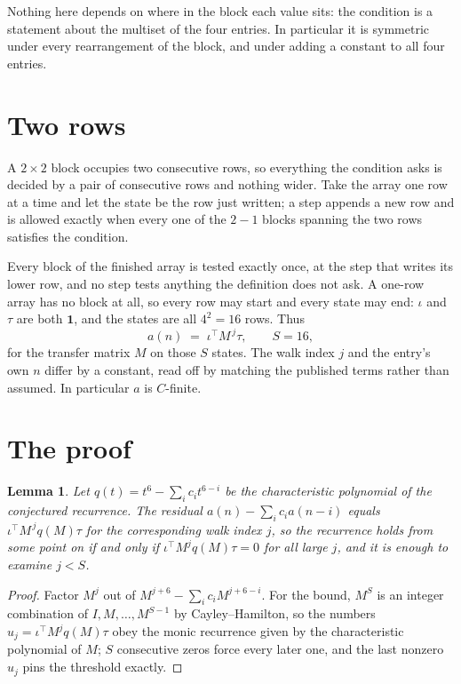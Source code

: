 \documentclass[11pt,a4paper]{article}
\theoremstyle{plain}
\newtheorem{lemma}[theorem]{Lemma}
\theoremstyle{definition}
\begin{document}
Nothing here depends on where in the block each value sits: the condition is a statement about
the multiset of the four entries. In particular it is symmetric under every rearrangement of
the block, and under adding a constant to all four entries.

\section{Two rows}

A $2\times2$ block occupies two consecutive rows, so everything the condition asks is decided
by a pair of consecutive rows and nothing wider. Take the array one row at a time and let the
state be the row just written; a step appends a new row and is allowed exactly when every one
of the $2-1$ blocks spanning the two rows satisfies the condition.

Every block of the finished array is tested exactly once, at the step that writes its lower
row, and no step tests anything the definition does not ask. A one-row array has no block at
all, so every row may start and every state may end: $\iota$ and $\tau$ are both
$\mathbf{1}$, and the states are all $4^{2}=16$ rows. Thus
\[
a(n)\;=\;\iota^{\!\top}M^{\,j}\tau ,\qquad S=16,
\]
for the transfer matrix $M$ on those $S$ states. The walk index $j$ and the entry's own $n$
differ by a constant, read off by matching the published terms rather than assumed. In
particular $a$ is $C$-finite.

\section{The proof}

\begin{lemma}\label{lem:crit}
Let $q(t)=t^{6}-\sum_i c_it^{6-i}$ be the characteristic polynomial of the
conjectured recurrence. The residual $a(n)-\sum_ic_ia(n-i)$ equals
$\iota^{\!\top}M^{\,j}q(M)\tau$ for the corresponding walk index $j$, so the recurrence
holds from some point on if and only if $\iota^{\!\top}M^{j}q(M)\tau=0$ for all large $j$,
and it is enough to examine $j<S$.
\end{lemma}

\begin{proof}
Factor $M^{j}$ out of $M^{j+6}-\sum_ic_iM^{j+6-i}$. For the bound, $M^{S}$
is an integer combination of $I,M,\dots,M^{S-1}$ by Cayley--Hamilton, so the numbers
$u_j=\iota^{\!\top}M^{j}q(M)\tau$ obey the monic recurrence given by the characteristic
polynomial of $M$; $S$ consecutive zeros force every later one, and the last nonzero $u_j$
pins the threshold exactly.
\end{proof}
\end{document}
